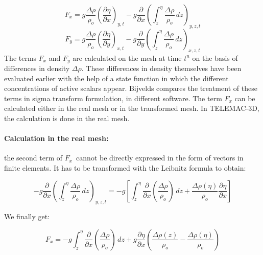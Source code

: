 \begin{equation}
F_{x}=g\dfrac{\Delta\rho}{\rho_{o}}\left(  \dfrac{\partial \eta}{\partial
x}\right)  _{y,t}-g\dfrac{\partial}{\partial x}\left(  \int\nolimits_{z}%
^{\eta}\dfrac{\Delta\rho}{\rho_{o}}\,dz\right)  _{y,z,t}%
\end{equation}
%
\begin{equation}
F_{y}=g\dfrac{\Delta\rho}{\rho_{o}}\left(  \dfrac{\partial \eta}{\partial
y}\right)  _{x,t}-g\dfrac{\partial}{\partial y}\left(  \int\nolimits_{z}%
^{\eta}\dfrac{\Delta\rho}{\rho_{o}}\,dz\right)  _{x,z,t}%
\end{equation}
%
The terms $F_{x}$ and $F_{y}$ are calculated on the mesh at time $t^{n}$ on
the basis of differences in density $\Delta\rho$. These differences in density
themselves have been evaluated earlier with the help of a state function in
which the different concentrations of active scalars appear.
Bijvelds \cite{bijvelds01} compares the treatment of these terms in sigma
transform formulation, in different software.
The term $F_{x}$ can be calculated either in the real mesh or in the transformed mesh.
In TELEMAC-3D, the calculation is done in the real mesh.

\paragraph{Calculation in the real mesh:}

the second term of $F_{x}$\ cannot be directly expressed in the form of
vectors in finite elements. It has to be transformed with the Leibnitz formula
to obtain:%

\begin{equation}
-g\dfrac{\partial}{\partial x}\left(  \int\nolimits_{z}^{\eta}\dfrac{\Delta
\rho}{\rho_{o}}\,dz\right)  _{y,z,t}=-g\left[  \int\nolimits_{z}^{\eta}%
\dfrac{\partial}{\partial x}\left(  \dfrac{\Delta\rho}{\rho_{o}}\right)
\,dz+\dfrac{\Delta\rho(\eta)}{\rho_{o}}\dfrac{\partial \eta}{\partial x}\right]
\end{equation}


We finally get:%

\begin{equation}
F_{x}=-g\int\nolimits_{z}^{\eta}\dfrac{\partial}{\partial x}\left(
\dfrac{\Delta\rho}{\rho_{o}}\right)  \,dz+g\dfrac{\partial \eta}{\partial
x}\left(  \dfrac{\Delta\rho(z)}{\rho_{o}}-\dfrac{\Delta\rho(\eta)}{\rho_{o}%
}\right)
\end{equation}


